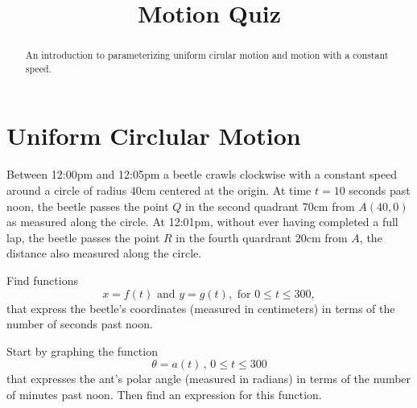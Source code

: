 \documentclass{ximera}
\title{Motion Quiz}
\begin{document}
\begin{abstract}
An introduction to parameterizing uniform cirular motion and motion with a constant speed.
\end{abstract}
\maketitle

\section{Uniform Circlular Motion}

\begin{question} \label{Qdbyp44:Motiondfdf}
Between 12:00pm and 12:05pm a beetle crawls clockwise with a constant speed around a circle of radius $40$cm centered at the origin. At time $t=10$ seconds past noon, the beetle passes the point $Q$ in the second quadrant $70$cm from $A(40,0)$ as measured along the circle. At 12:01pm, without ever having completed a full lap, the beetle passes the point $R$ in the fourth quardrant $20$cm from $A$, the distance also measured along the circle. 

Find functions
\[
   x = f(t) \text{ and } y=g(t) , \text{ for } 0\leq t \leq 300 ,
\]
that express the beetle's coordinates (measured in centimeters) in terms of the number of seconds past noon. 

Start by graphing the function
\[
    \theta = a(t) \, , \, 0\leq t \leq 300 
\] 
that expresses the ant's polar angle (measured in radians) in terms of the number of minutes past noon. Then find an expression for this function.


 
\begin{onlineOnly}
    \begin{center}
\end{center}
\end{onlineOnly}

\end{question}
\end{document}
